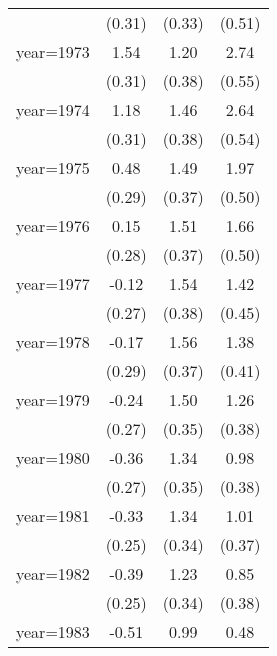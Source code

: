 \begin{sidewaystable}[htbp]
\begin{tabular}{l*{3}{c}}
                &   (0.31)         &   (0.33)         &   (0.51)         \\
\addlinespace
year=1973       &     1.54\sym{***}&     1.20\sym{***}&     2.74\sym{***}\\
                &   (0.31)         &   (0.38)         &   (0.55)         \\
\addlinespace
year=1974       &     1.18\sym{***}&     1.46\sym{***}&     2.64\sym{***}\\
                &   (0.31)         &   (0.38)         &   (0.54)         \\
\addlinespace
year=1975       &     0.48         &     1.49\sym{***}&     1.97\sym{***}\\
                &   (0.29)         &   (0.37)         &   (0.50)         \\
\addlinespace
year=1976       &     0.15         &     1.51\sym{***}&     1.66\sym{***}\\
                &   (0.28)         &   (0.37)         &   (0.50)         \\
\addlinespace
year=1977       &    -0.12         &     1.54\sym{***}&     1.42\sym{***}\\
                &   (0.27)         &   (0.38)         &   (0.45)         \\
\addlinespace
year=1978       &    -0.17         &     1.56\sym{***}&     1.38\sym{***}\\
                &   (0.29)         &   (0.37)         &   (0.41)         \\
\addlinespace
year=1979       &    -0.24         &     1.50\sym{***}&     1.26\sym{***}\\
                &   (0.27)         &   (0.35)         &   (0.38)         \\
\addlinespace
year=1980       &    -0.36         &     1.34\sym{***}&     0.98\sym{**} \\
                &   (0.27)         &   (0.35)         &   (0.38)         \\
\addlinespace
year=1981       &    -0.33         &     1.34\sym{***}&     1.01\sym{***}\\
                &   (0.25)         &   (0.34)         &   (0.37)         \\
\addlinespace
year=1982       &    -0.39         &     1.23\sym{***}&     0.85\sym{**} \\
                &   (0.25)         &   (0.34)         &   (0.38)         \\
\addlinespace
year=1983       &    -0.51\sym{**} &     0.99\sym{***}&     0.48         \\

\end{tabular}
\end{sidewaystable}

